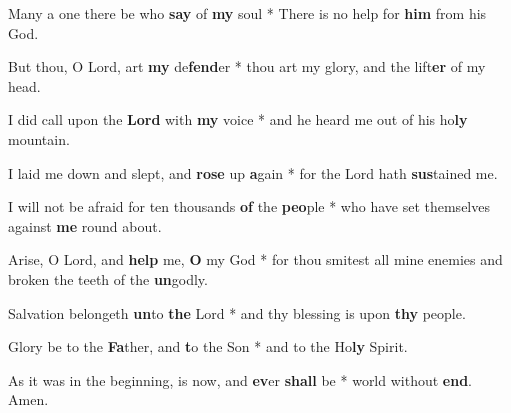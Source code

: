\begin{multicols}{2}
	Many a one there be who \textbf{say} of \textbf{my} soul * There is no help for \textbf{him} from his God.
	
	But thou, O Lord, art \textbf{my} de\textbf{fend}er * thou art my glory, and the lift\textbf{er} of my head.
	
	I did call upon the \textbf{Lord} with \textbf{my} voice * and he heard me out of his ho\textbf{ly} mountain.
	
	I laid me down and slept, and \textbf{rose} up \textbf{a}gain * for the Lord hath \textbf{sus}tained me.
	
	I will not be afraid for ten thousands \textbf{of} the \textbf{peo}ple * who have set themselves against \textbf{me} round about.
	
	Arise, O Lord, and \textbf{help} me, \textbf{O} my God * for thou smitest all mine enemies and broken the teeth of the \textbf{un}godly.
	
	Salvation belongeth \textbf{un}to \textbf{the} Lord * and thy blessing is upon \textbf{thy} people.
	
	Glory be to the \textbf{Fa}ther, and \textbf{t}o the Son * and to the Ho\textbf{ly} Spirit.
	
	As it was in the beginning, is now, and \textbf{ev}er \textbf{shall} be * world without \textbf{end}. Amen.
\end{multicols}